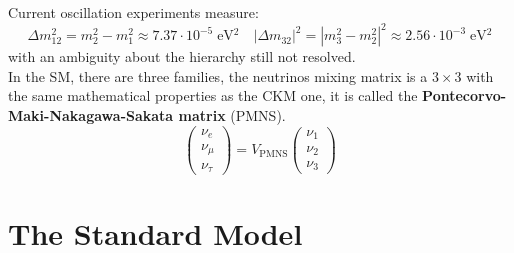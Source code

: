 \documentclass[10.75pt,a4paper,openright,bottom=2cm]{article}
\begin{document}
Current oscillation experiments measure:
\[
\Delta m_{12}^2=m_2^2-m_1^2\approx7.37\cdot10^{-5}\;\text{eV$^2$} \quad |\Delta m_{32}|^2=|m_3^2-m_2^2|^2\approx2.56\cdot10^{-3}\;\text{eV$^2$}
\]
with an ambiguity about the hierarchy still not resolved.\\
In the SM, there are three families, the neutrinos mixing matrix is a $3\times3$ with the same mathematical properties as the CKM one, it is called the \textbf{Pontecorvo-Maki-Nakagawa-Sakata matrix} (PMNS). 
\[
\begin{pmatrix}
    \nu_e\\ \nu_\mu\\ \nu_\tau
\end{pmatrix}=V_{\text{PMNS}}\begin{pmatrix}
    \nu_1\\ \nu_2\\ \nu_3
\end{pmatrix}
\]
\newpage
\section{The Standard Model}
\end{document}
